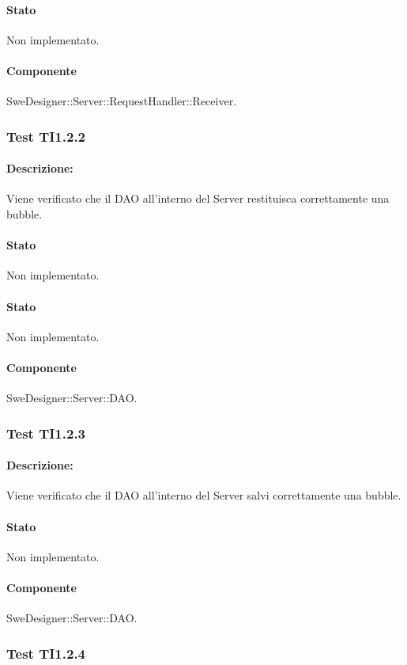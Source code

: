 \documentclass[../PianoDiQualifica.tex]{subfiles}
\begin{document}
	\paragraph{Stato} Non implementato.
	\paragraph{Componente} SweDesigner::Server::RequestHandler::Receiver.
	\subsubsection{Test TI1.2.2}
	\paragraph{Descrizione:} Viene verificato che il DAO all'interno del Server restituisca correttamente una bubble.
	\paragraph{Stato} Non implementato.
	\paragraph{Stato} Non implementato.
	\paragraph{Componente} SweDesigner::Server::DAO.
	
	\subsubsection{Test TI1.2.3}
	\paragraph{Descrizione:} Viene verificato che il DAO all'interno del Server salvi correttamente una bubble.
	\paragraph{Stato} Non implementato.
	\paragraph{Componente} SweDesigner::Server::DAO.
	\subsubsection{Test TI1.2.4}
\end{document}
